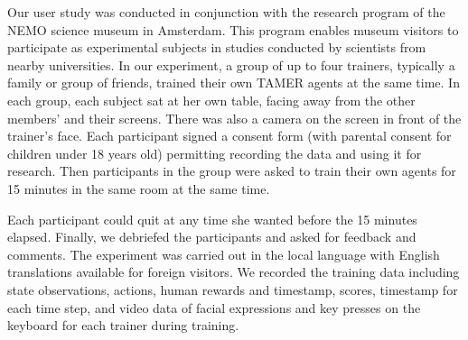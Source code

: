 \documentclass[10pt,journal,compsoc]{IEEEtran}
\begin{document}

Our user study was conducted in conjunction with the research program of the NEMO science museum in Amsterdam.  This program enables museum visitors to participate as experimental subjects in studies conducted by scientists from nearby universities.  In our experiment, a group of up to four trainers, typically a family or group of friends, trained their own TAMER agents at the same time. In each group, each subject sat at her own table, facing away from the other members' and their screens. There was also a camera on the screen in front of the trainer's face. Each participant signed a consent form (with parental consent for children under 18 years old) permitting recording the data and using it for research.
Then participants in the group were asked to train their own agents for 15 minutes in the same room at the same time. 

Each participant could quit at any time she wanted before the 15 minutes elapsed. Finally, we debriefed the participants and asked for feedback and comments. The experiment was carried out in the local language with English translations available for foreign visitors. We recorded the training data including state observations, actions, human rewards and timestamp, scores, timestamp for each time step, and video data of facial expressions and key presses on the keyboard for each trainer during training. %



\end{document}
